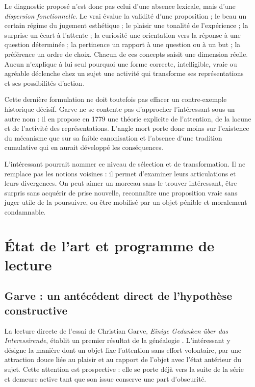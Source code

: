 \documentclass[11pt,a4paper]{article}
\begin{document}
Le diagnostic proposé n'est donc pas celui d'une absence lexicale, mais d'une
\emph{dispersion fonctionnelle}. Le vrai évalue la validité d'une proposition ;
le beau un certain régime du jugement esthétique ; le plaisir une tonalité de
l'expérience ; la surprise un écart à l'attente ; la curiosité une orientation
vers la réponse à une question déterminée ; la pertinence un rapport à une question ou à
un but ; la préférence un ordre de choix. Chacun de ces concepts saisit une
dimension réelle. Aucun n'explique à lui seul pourquoi une forme correcte,
intelligible, vraie ou agréable déclenche chez un sujet une activité qui
transforme ses représentations et ses possibilités d'action.

Cette dernière formulation ne doit toutefois pas effacer un contre-exemple
historique décisif. Garve ne se contente pas d'approcher l'intéressant sous un
autre nom : il en propose en 1779 une théorie explicite de l'attention, de la
lacune et de l'activité des représentations. L'angle mort porte donc moins sur
l'existence du mécanisme que sur sa faible canonisation et l'absence d'une
tradition cumulative qui en aurait développé les conséquences.

L'intéressant pourrait nommer ce niveau de sélection et de transformation. Il ne
remplace pas les notions voisines : il permet d'examiner leurs articulations et
leurs divergences. On peut aimer un morceau sans le trouver intéressant, être
surpris sans acquérir de prise nouvelle, reconnaître une proposition vraie sans
juger utile de la poursuivre, ou être mobilisé par un objet pénible et
moralement condamnable.

\section{État de l'art et programme de lecture}

\subsection{Garve : un antécédent direct de l'hypothèse constructive}

La lecture directe de l'essai de Christian Garve, \emph{Einige Gedanken über
das Interessirende}, établit un premier résultat de la généalogie
\parencite[253--274, 313--317]{garve1779interessirende}. L'intéressant y désigne
la manière dont un objet fixe l'attention sans effort volontaire, par une
attraction douce liée au plaisir et au rapport de l'objet avec l'état antérieur
du sujet. Cette attention est prospective : elle se porte déjà vers la suite de
la série et demeure active tant que son issue conserve une part d'obscurité.
\end{document}
